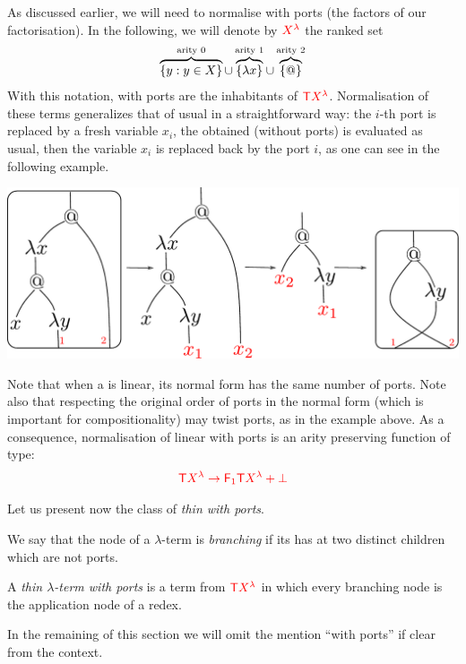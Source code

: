 As discussed earlier, we will need to normalise \lambdaterms with ports (the factors of our factorisation). In the following, we will denote by ${\color{red}{{\color{red}{{X}^{{\color{red}{\lambda}}}}}}}$ the ranked set 
\begin{align*}
     \overbrace{\{y : y \in X\}}^{\text{arity 0}} \cup \overbrace{\{\lambda x \}}^{\text{arity 1}} \cup  \overbrace{\{@\}}^{\text{arity 2}}
\end{align*}
With this notation, \lambdaterms with ports are the inhabitants of ${\color{red}{{\color{red}{\mathsf T}}{\color{red}{{X}^{{\color{red}{\lambda}}}}}}}$. Normalisation of these terms generalizes that of usual \lambdaterms in a straightforward way: the $i$-th port is replaced by a fresh variable $x_i$, the obtained \lambdaterm (without ports) is evaluated as usual, then the variable $x_i$ is replaced back by the port $i$, as one can see in the following example.  
  \begin{center}
\includegraphics[scale=.4]{pictures/normalization-with-ports.pdf}
\end{center}
  Note that when a \lambdaterm is linear, its normal form has the same number of ports. Note also that respecting the original order of ports in the normal form (which is important for compositionality) may twist ports, as in the example above. As a consequence, normalisation of linear \lambdaterms with ports is an arity preserving function of  type:
  \begin{align*}
  {\color{red}{{\color{red}{\mathsf T}}{\color{red}{{X}^{{\color{red}{\lambda}}}}} \to {\color{red}{\mathsf F_{1}}}{\color{red}{\mathsf T}}{\color{red}{{X}^{{\color{red}{\lambda}}}}} +\bot}} 
  \end{align*}
   
Let us present now the class of \emph{thin \lambdaterms with ports}.
 
\begin{definition}
We say that the node of a $\lambda$-term is \emph{branching} if its has at two distinct children which are not ports.
 
A \emph{thin $\lambda$-term with ports} is a term from ${\color{red}{\mathsf T}} {\color{red}{{X}^{{\color{red}{\lambda}}}}}$ in which every branching node is the application node of a redex. 
\end{definition}
In the remaining of this section we will omit the mention ``with ports'' if clear from the context.

